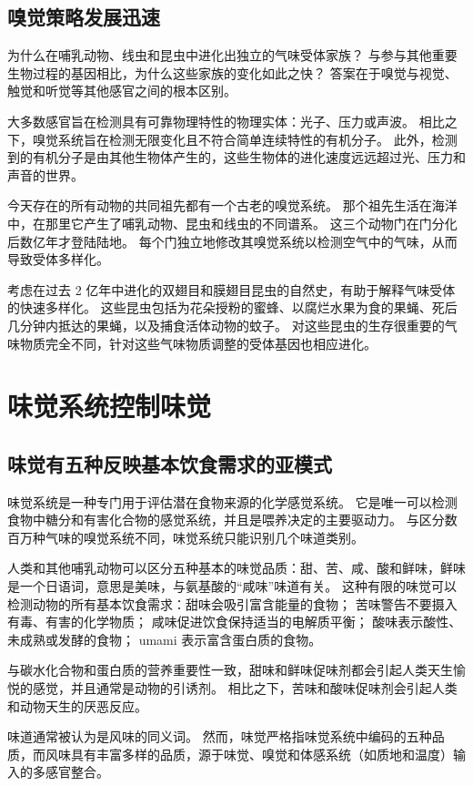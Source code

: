 \subsection{嗅觉策略发展迅速}
为什么在哺乳动物、线虫和昆虫中进化出独立的气味受体家族？ 与参与其他重要生物过程的基因相比，为什么这些家族的变化如此之快？ 答案在于嗅觉与视觉、触觉和听觉等其他感官之间的根本区别。

大多数感官旨在检测具有可靠物理特性的物理实体：光子、压力或声波。 相比之下，嗅觉系统旨在检测无限变化且不符合简单连续特性的有机分子。 此外，检测到的有机分子是由其他生物体产生的，这些生物体的进化速度远远超过光、压力和声音的世界。

今天存在的所有动物的共同祖先都有一个古老的嗅觉系统。 那个祖先生活在海洋中，在那里它产生了哺乳动物、昆虫和线虫的不同谱系。 这三个动物门在门分化后数亿年才登陆陆地。 每个门独立地修改其嗅觉系统以检测空气中的气味，从而导致受体多样化。

考虑在过去 2 亿年中进化的双翅目和膜翅目昆虫的自然史，有助于解释气味受体的快速多样化。 这些昆虫包括为花朵授粉的蜜蜂、以腐烂水果为食的果蝇、死后几分钟内抵达的果蝇，以及捕食活体动物的蚊子。 对这些昆虫的生存很重要的气味物质完全不同，针对这些气味物质调整的受体基因也相应进化。


\section{味觉系统控制味觉}
\subsection{味觉有五种反映基本饮食需求的亚模式}
味觉系统是一种专门用于评估潜在食物来源的化学感觉系统。 它是唯一可以检测食物中糖分和有害化合物的感觉系统，并且是喂养决定的主要驱动力。 与区分数百万种气味的嗅觉系统不同，味觉系统只能识别几个味道类别。

人类和其他哺乳动物可以区分五种基本的味觉品质：甜、苦、咸、酸和鲜味，鲜味是一个日语词，意思是美味，与氨基酸的“咸味”味道有关。 这种有限的味觉可以检测动物的所有基本饮食需求：甜味会吸引富含能量的食物； 苦味警告不要摄入有毒、有害的化学物质； 咸味促进饮食保持适当的电解质平衡； 酸味表示酸性、未成熟或发酵的食物； umami 表示富含蛋白质的食物。

与碳水化合物和蛋白质的营养重要性一致，甜味和鲜味促味剂都会引起人类天生愉悦的感觉，并且通常是动物的引诱剂。 相比之下，苦味和酸味促味剂会引起人类和动物天生的厌恶反应。

味道通常被认为是风味的同义词。 然而，味觉严格指味觉系统中编码的五种品质，而风味具有丰富多样的品质，源于味觉、嗅觉和体感系统（如质地和温度）输入的多感官整合。



